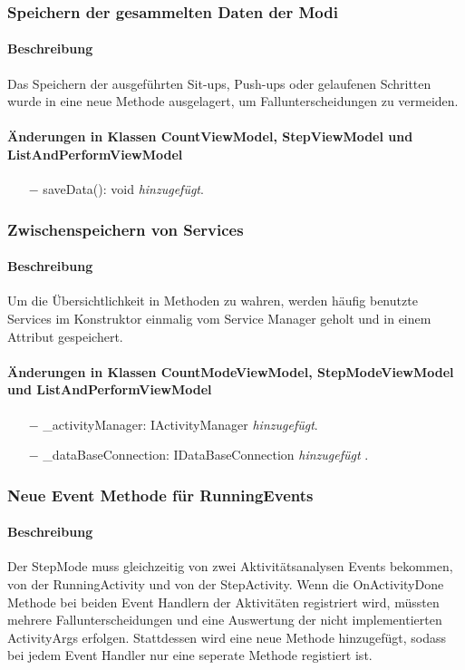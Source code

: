 \documentclass[a4paper,12pt]{article}
\begin{document}
\subsubsection{Speichern der gesammelten Daten der Modi}
\paragraph{Beschreibung}
Das Speichern der ausgeführten Sit-ups, Push-ups oder gelaufenen Schritten wurde in eine neue Methode ausgelagert, um Fallunterscheidungen zu vermeiden.
\paragraph{Änderungen in Klassen CountViewModel, StepViewModel und ListAndPerformViewModel} 
\begin{itemize}
	\item[$-$] saveData(): void \textit{hinzugefügt}.
\end{itemize}

\subsubsection{Zwischenspeichern von Services}
\paragraph{Beschreibung}
Um die Übersichtlichkeit in Methoden zu wahren, werden häufig benutzte Services im Konstruktor einmalig vom Service Manager geholt und in einem Attribut gespeichert.
\paragraph{Änderungen in Klassen CountModeViewModel, StepModeViewModel und ListAndPerformViewModel} 
\begin{itemize}
	\item[$-$] \_activityManager: IActivityManager \textit{hinzugefügt}.
	\item[$-$] \_dataBaseConnection: IDataBaseConnection \textit{hinzugefügt} .
\end{itemize}

\subsubsection{Neue Event Methode für RunningEvents}
\paragraph{Beschreibung}
Der StepMode muss gleichzeitig von zwei Aktivitätsanalysen Events bekommen, von der RunningActivity und von der StepActivity. Wenn die OnActivityDone Methode bei beiden Event Handlern der Aktivitäten registriert wird, müssten mehrere Fallunterscheidungen und eine Auswertung der nicht implementierten ActivityArgs erfolgen. Stattdessen wird eine neue Methode hinzugefügt, sodass bei jedem Event Handler nur eine seperate Methode registiert ist.
\end{document}
